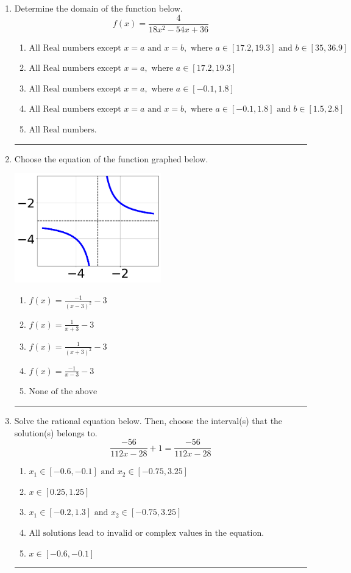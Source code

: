 \documentclass[14pt]{extbook}
\newcommand{\litem}[1]{\item#1\hspace*{-1cm}\rule{\textwidth}{0.4pt}}
\begin{document}
\begin{enumerate}
\litem{
Determine the domain of the function below.\[ f(x) = \frac{4}{18x^{2} -54 x + 36} \]\begin{enumerate}[label=\Alph*.]
\item \( \text{All Real numbers except } x = a \text{ and } x = b, \text{ where } a \in [17.2, 19.3] \text{ and } b \in [35, 36.9] \)
\item \( \text{All Real numbers except } x = a, \text{ where } a \in [17.2, 19.3] \)
\item \( \text{All Real numbers except } x = a, \text{ where } a \in [-0.1, 1.8] \)
\item \( \text{All Real numbers except } x = a \text{ and } x = b, \text{ where } a \in [-0.1, 1.8] \text{ and } b \in [1.5, 2.8] \)
\item \( \text{All Real numbers.} \)

\end{enumerate} }
\litem{
Choose the equation of the function graphed below.
\begin{center}
    \includegraphics[width=0.5\textwidth]{../Figures/rationalGraphToEquationCopyB.png}
\end{center}
\begin{enumerate}[label=\Alph*.]
\item \( f(x) = \frac{-1}{(x - 3)^2} - 3 \)
\item \( f(x) = \frac{1}{x + 3} - 3 \)
\item \( f(x) = \frac{1}{(x + 3)^2} - 3 \)
\item \( f(x) = \frac{-1}{x - 3} - 3 \)
\item \( \text{None of the above} \)

\end{enumerate} }
\litem{
Solve the rational equation below. Then, choose the interval(s) that the solution(s) belongs to.\[ \frac{-56}{112x -28} + 1 = \frac{-56}{112x -28} \]\begin{enumerate}[label=\Alph*.]
\item \( x_1 \in [-0.6, -0.1] \text{ and } x_2 \in [-0.75,3.25] \)
\item \( x \in [0.25,1.25] \)
\item \( x_1 \in [-0.2, 1.3] \text{ and } x_2 \in [-0.75,3.25] \)
\item \( \text{All solutions lead to invalid or complex values in the equation.} \)
\item \( x \in [-0.6,-0.1] \)


\end{enumerate}}
\end{enumerate}
\end{document}
